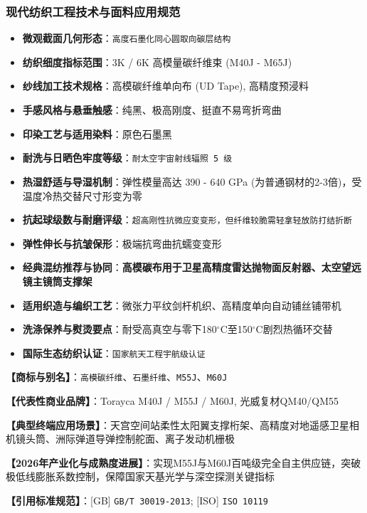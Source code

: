 \documentclass[11pt,openright,twoside,UTF8]{ctexbook}
\begin{document}
\subsubsection*{现代纺织工程技术与面料应用规范}
\begin{itemize} \setlength{\itemsep}{2pt}
    \item \textbf{微观截面几何形态}：\texttt{高度石墨化同心圆取向碳层结构}
    \item \textbf{纺织细度指标范围}：3K / 6K 高模量碳纤维束 (M40J - M65J)
    \item \textbf{纱线加工技术规格}：高模碳纤维单向布 (UD Tape), 高精度预浸料
    \item \textbf{手感风格与悬垂触感}：纯黑、极高刚度、挺直不易弯折弯曲
    \item \textbf{印染工艺与适用染料}：原色石墨黑
    \item \textbf{耐洗与日晒色牢度等级}：\texttt{耐太空宇宙射线辐照 5 级}
    \item \textbf{热湿舒适与导湿机制}：弹性模量高达 390 - 640 GPa (为普通钢材的2-3倍)，受温度冷热交替尺寸形变为零
    \item \textbf{抗起球级数与耐磨评级}：\texttt{超高刚性抗微应变变形，但纤维较脆需轻拿轻放防打结折断}
    \item \textbf{弹性伸长与抗皱保形}：极端抗弯曲抗蠕变变形
    \item \textbf{经典混纺推荐与协同}：\textbf{高模碳布用于卫星高精度雷达抛物面反射器、太空望远镜主镜筒支撑架}
    \item \textbf{适用织造与编织工艺}：微张力平纹剑杆机织、高精度单向自动铺丝铺带机
    \item \textbf{洗涤保养与熨烫要点}：耐受高真空与零下180$^\circ\mathrm{C}$至150$^\circ\mathrm{C}$剧烈热循环交替
    \item \textbf{国际生态纺织认证}：\texttt{国家航天工程宇航级认证}
\end{itemize}
\vspace{0.2cm}

\noindent\textbf{【商标与别名】}：\texttt{高模碳纤维}、\texttt{石墨纤维}、\texttt{M55J}、\texttt{M60J}\par
\noindent\textbf{【代表性商业品牌】}：Torayca M40J / M55J / M60J, 光威复材QM40/QM55\par
\noindent\textbf{【典型终端应用场景】}：天宫空间站柔性太阳翼支撑桁架、高精度对地遥感卫星相机镜头筒、洲际弹道导弹控制舵面、离子发动机栅极\par
\noindent\textbf{【2026年产业化与成熟度进展】}：实现M55J与M60J百吨级完全自主供应链，突破极低线膨胀系数控制，保障国家天基光学与深空探测关键指标\par
\noindent\textbf{【引用标准规范】}：[GB] \texttt{GB/T 30019-2013}; [ISO] \texttt{ISO 10119}\par
\vspace{0.5cm}
\end{document}
